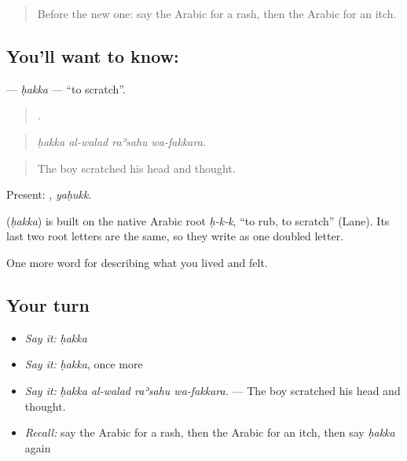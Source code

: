 \begin{quote}
Before the new one: say the Arabic for a rash, then the Arabic for an itch.
\end{quote}

\subsection*{You'll want to know: }
\textbf{} — \emph{ḥakka} — \textquotedblleft{}to scratch\textquotedblright{}.

\begin{quote}
   .
\end{quote}

\begin{quote}
\emph{ḥakka al-walad raʾsahu wa-fakkara.}
\end{quote}

\begin{quote}
The boy scratched his head and thought.
\end{quote}

Present: , \emph{yaḥukk}.

\begin{cousinweb}
\textbf{} (\emph{ḥakka}) is built on the native Arabic root \emph{ḥ-k-k}, \textquotedblleft{}to rub, to scratch\textquotedblright{} (Lane). Its last two root letters are the same, so they write as one doubled letter.
\end{cousinweb}

\begin{grammarlens}[title={What you've built}]
One more word for describing what you lived and felt.
\end{grammarlens}

\subsection*{Your turn}
\begin{itemize}
\raggedright
  \item \emph{Say it:} \emph{ḥakka}
  \item \emph{Say it:} \emph{ḥakka}, once more
  \item \emph{Say it:} \emph{ḥakka al-walad raʾsahu wa-fakkara.} — The boy scratched his head and thought.
  \item \emph{Recall:} say the Arabic for a rash, then the Arabic for an itch, then say \emph{ḥakka} again
\end{itemize}


